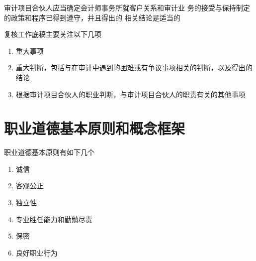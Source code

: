 \documentclass[UTF8,12pt]{ctexart}
\numberwithin{equation}{section} %
\numberwithin{figure}{section}
\numberwithin{table}{section}
\begin{document}
	审计项目合伙人应当确定会计师事务所就客户关系和审计业 务的接受与保持制定的政策和程序已得到遵守，并且得出的 相关结论是适当的
	
	复核工作底稿主要关注以下几项
	\begin{enumerate}
		\item 重大事项
		
		\item 重大判断，包括与在审计中遇到的困难或有争议事项相关的判断，以及得出的结论
		
		\item 根据审计项目合伙人的职业判断，与审计项目合伙人的职责有关的其他事项
	\end{enumerate}
	
	\newpage
	\section{职业道德基本原则和概念框架}
	职业道德基本原则有如下几个
	\begin{enumerate}
		\item 诚信
		
		\item 客观公正
		
		\item 独立性
		
		\item 专业胜任能力和勤勉尽责
		
		\item 保密
		
		\item 良好职业行为
	\end{enumerate}
	
\end{document}
